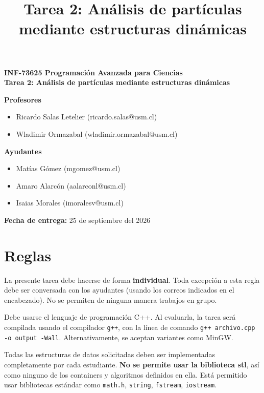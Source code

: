 \documentclass[11pt, letterpaper]{article}
\title{\textbf{Tarea 2: Análisis de partículas mediante estructuras dinámicas}}
\author{}
\date{}
\begin{document}
\begin{center}
    \vspace*{\fill}
    \LARGE \textbf{INF-73625 Programación Avanzada para Ciencias}\\
    \Large \textbf{Tarea 2: Análisis de partículas mediante estructuras dinámicas}
\end{center}

\vspace{0.5cm}

\noindent
\textbf{Profesores}
\begin{itemize}[noitemsep, topsep=0pt]
    \item Ricardo Salas Letelier (ricardo.salas@usm.cl)
    \item Wladimir Ormazabal (wladimir.ormazabal@usm.cl)
\end{itemize}

\vspace{0.3cm}
\noindent
\textbf{Ayudantes}
\begin{itemize}[noitemsep, topsep=0pt]
    \item Matías Gómez (mgomez@usm.cl)
    \item Amaro Alarcón (aalarconl@usm.cl)
    \item Isaias Morales (imoralesv@usm.cl)
\end{itemize}

\vspace{0.3cm}
\noindent
\textbf{Fecha de entrega:} 25 de septiembre del 2026
\vspace*{\fill}


\tableofcontents
\newpage

\section{Reglas}
La presente tarea debe hacerse de forma \textbf{individual}. Toda excepción a esta regla debe ser conversada con los ayudantes (usando los correos indicados en el encabezado). No se permiten de ninguna manera trabajos en grupo.

Debe usarse el lenguaje de programación C++. Al evaluarla, la tarea será compilada usando el compilador \texttt{g++}, con la línea de comando \texttt{g++ archivo.cpp -o output -Wall}. Alternativamente, se aceptan variantes como MinGW.

Todas las estructuras de datos solicitadas deben ser implementadas completamente por cada estudiante. \textbf{No se permite usar la biblioteca stl}, así como ninguno de los containers y algoritmos definidos en ella. Está permitido usar bibliotecas estándar como \texttt{math.h}, \texttt{string}, \texttt{fstream}, \texttt{iostream}.
\end{document}
